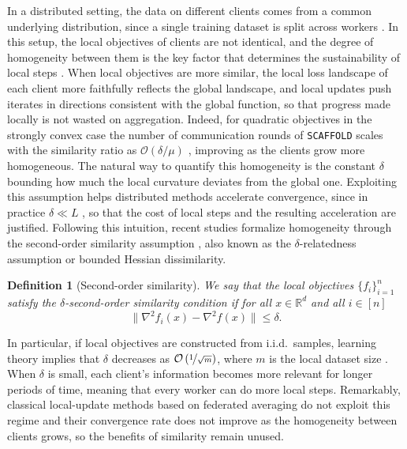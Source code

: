 \documentclass{article}
\newtheorem{definition}{Definition}
\begin{document}
In a distributed setting, the data on different clients comes
from a common underlying distribution, since a single training dataset is split across workers \cite{zinkevich2010parallelized, dekel2012optimal}. In this setup, 
the local objectives of clients are not identical, and the degree of homogeneity 
between them is the key factor that determines the sustainability of local 
steps \cite{karimireddy2020scaffold, woodworth2020minibatch}. When local 
objectives are more similar, the local loss landscape of each client more 
faithfully reflects the global landscape, and local updates push iterates 
in directions consistent with the global function, so that progress made locally is not wasted on aggregation. Indeed, for quadratic objectives in the strongly convex case the number of communication rounds of \texttt{SCAFFOLD} scales with the similarity ratio as $\mathcal{O}(\delta/\mu)$ \cite{karimireddy2020scaffold}, improving as the clients grow more homogeneous. The natural way to quantify this homogeneity is the constant $\delta$ bounding how much the local curvature deviates from the global one. Exploiting this assumption helps distributed methods accelerate convergence, since in practice $\delta \ll L$ \cite{arjevani2015communication, kovalev2022optimal}, so that the cost of local steps and the resulting acceleration are justified. Following this intuition, recent 
studies formalize homogeneity through the second-order similarity assumption 
\citep{kovalev2022optimal, lin2023stochastic, karagulyan2024spamstochasticproximalpoint}, 
also known as the $\delta$-relatedness assumption or bounded Hessian dissimilarity.


\begin{definition}[Second-order similarity]
\label{second-order-similarity}
We say that the local objectives $\{f_i\}_{i=1}^n$ satisfy the $\delta$-second-order similarity condition if for all $x \in \mathbb{R}^d$ and all $i \in [n]$
\begin{equation}
    \|\nabla^2 f_i(x) - \nabla^2 f(x)\| \le \delta.
\end{equation}
\end{definition}

In particular, if local objectives are constructed from i.i.d.\ samples, learning theory implies that $\delta$ decreases as $\mathcal{O}\left(\nicefrac{1}{\sqrt m}\right)$, where $m$ is the local dataset size \citep{hendrikx2020statistically}. When $\delta$ is small, each client's information becomes more relevant for longer periods of time, meaning that every worker can do more local steps. Remarkably, classical local-update methods based on federated averaging do not exploit this regime and their convergence rate does not improve as the homogeneity between clients grows, so the benefits of similarity remain unused. 
\end{document}
